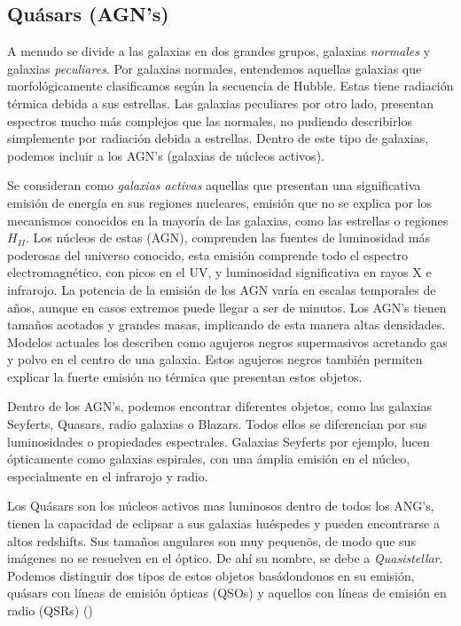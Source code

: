 \documentclass[a4paper,10pt]{article}
\begin{document}
\subsection{Qu\'asars (AGN's)}

A menudo se divide a las galaxias en dos grandes grupos, galaxias \textit{normales} y galaxias \textit{peculiares}. Por galaxias normales, entendemos aquellas galaxias que morfol\'ogicamente clasificamos seg\'un la secuencia de Hubble. Estas tiene radiaci\'on t\'ermica debida a sus estrellas. Las galaxias peculiares por otro lado, presentan espectros mucho m\'as complejos que las normales, no pudiendo describirlos simplemente por radiaci\'on debida a estrellas. Dentro de este tipo de galaxias, podemos incluir a los AGN's (galaxias de n\'ucleos activos). 

Se consideran como \textit{galaxias activas} aquellas que presentan una significativa emisi\'on de energ\'ia en sus regiones nucleares, emisi\'on que no se explica por los mecanismos  conocidos en la mayor\'ia de las galaxias, como las estrellas o regiones $H_{II}$. Los n\'ucleos de estas (AGN), comprenden las fuentes de luminosidad m\'as poderosas del universo conocido, esta emisi\'on comprende todo el espectro electromagn\'etico, con picos en el UV, y luminosidad significativa en rayos X e infrarojo. La potencia de la emisi\'on de los AGN var\'ia en escalas temporales de a\~nos, aunque en casos extremos puede llegar a ser de minutos. Los AGN's tienen tama\~nos acotados y grandes masas, implicando de esta manera altas densidades. Modelos actuales los describen como agujeros negros supermasivos acretando gas y polvo en el centro de una galaxia. Estos agujeros negros tambi\'en permiten explicar la fuerte emisi\'on no t\'ermica que presentan estos objetos.  

Dentro de los AGN's, podemos encontrar diferentes objetos, como las galaxias Seyferts, Quasars, radio galaxias o Blazars. Todos ellos se diferencian por sus luminosidades o propiedades espectrales. Galaxias Seyferts por ejemplo, lucen \'opticamente como galaxias espirales, con una \'amplia emisi\'on en el n\'ucleo, especialmente en el infrarojo y radio. 






Los Qu\'asars son los n\'ucleos activos mas luminosos dentro de todos los ANG's, tienen la capacidad de eclipsar a sus galaxias hu\'espedes y pueden encontrarse a altos redshifts. Sus tama\~nos angulares son muy pequen\~os, de modo que sus im\'agenes no se resuelven en el \'optico. De ah\'i su nombre, se debe a \textit{Quasistellar}. Podemos distinguir dos tipos de estos objetos bas\'adondonos en su emisi\'on, qu\'asars con l\'ineas de emisi\'on \'opticas (QSOs) y aquellos con l\'ineas de emisi\'on en radio (QSRs) (\citealt{Elmegreen,Schneider})
\end{document}
